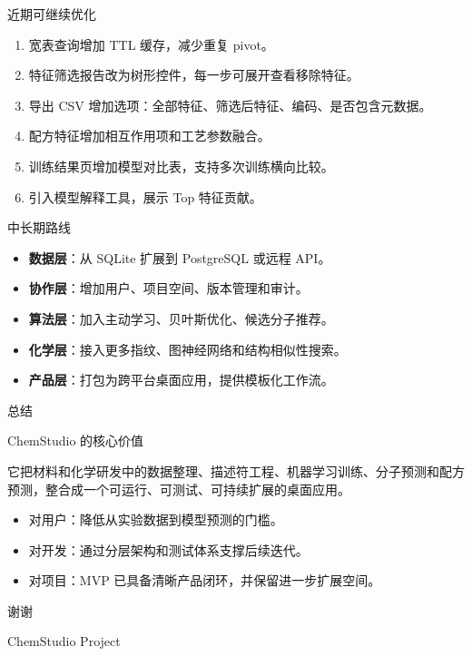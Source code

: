 \documentclass[aspectratio=169,11pt]{beamer}
\newcommand{\kw}[1]{\textcolor{ChemBlue}{\textbf{#1}}}
\newenvironment{templatebox}[1]{%
  \begin{beamerboxesrounded}[upper=block title,lower=block body,shadow=false]{#1}%
  \small
}{%
  \end{beamerboxesrounded}%
}
\begin{document}
\begin{frame}{近期可继续优化}
  \begin{enumerate}
    \item 宽表查询增加 TTL 缓存，减少重复 pivot。
    \item 特征筛选报告改为树形控件，每一步可展开查看移除特征。
    \item 导出 CSV 增加选项：全部特征、筛选后特征、编码、是否包含元数据。
    \item 配方特征增加相互作用项和工艺参数融合。
    \item 训练结果页增加模型对比表，支持多次训练横向比较。
    \item 引入模型解释工具，展示 Top 特征贡献。
  \end{enumerate}
\end{frame}

\begin{frame}{中长期路线}
  \begin{itemize}
    \item \kw{数据层}：从 SQLite 扩展到 PostgreSQL 或远程 API。
    \item \kw{协作层}：增加用户、项目空间、版本管理和审计。
    \item \kw{算法层}：加入主动学习、贝叶斯优化、候选分子推荐。
    \item \kw{化学层}：接入更多指纹、图神经网络和结构相似性搜索。
    \item \kw{产品层}：打包为跨平台桌面应用，提供模板化工作流。
  \end{itemize}
\end{frame}

\begin{frame}{总结}
  \begin{templatebox}{ChemStudio 的核心价值}
    它把材料和化学研发中的数据整理、描述符工程、机器学习训练、分子预测和配方预测，整合成一个可运行、可测试、可持续扩展的桌面应用。
  \end{templatebox}

  \vspace{0.3cm}
  \begin{itemize}
    \item 对用户：降低从实验数据到模型预测的门槛。
    \item 对开发：通过分层架构和测试体系支撑后续迭代。
    \item 对项目：MVP 已具备清晰产品闭环，并保留进一步扩展空间。
  \end{itemize}
\end{frame}

\begin{frame}
  \centering
  \Huge 谢谢

  \vspace{0.5cm}
  \Large ChemStudio Project
\end{frame}
\end{document}
